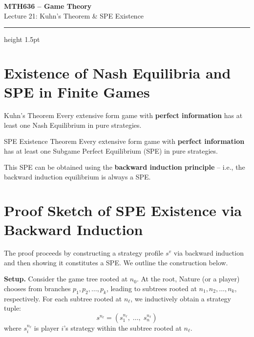 \documentclass[12pt, a4paper]{article}
\begin{document}
\begin{center}
  {\LARGE\bfseries\sffamily\color{defblue} MTH636 -- Game Theory}\\[6pt]
  {\Large\sffamily Lecture 21: Kuhn's Theorem \& SPE Existence}\\[4pt]
\end{center}
\vspace{0.5cm}
\hrule height 1.5pt
\vspace{0.3cm}

\section{Existence of Nash Equilibria and SPE in Finite Games}

\begin{thmbox}{Kuhn's Theorem}
  Every extensive form game with \textbf{perfect information} has at least one Nash Equilibrium in pure strategies.
\end{thmbox}

\begin{thmbox}{SPE Existence Theorem}
  Every extensive form game with \textbf{perfect information} has at least one Subgame Perfect Equilibrium (SPE) in pure strategies.
\end{thmbox}

\begin{notebox}
  This SPE can be obtained using the \textbf{backward induction principle} -- i.e., the backward induction equilibrium is always a SPE.
\end{notebox}

\section{Proof Sketch of SPE Existence via Backward Induction}

The proof proceeds by constructing a strategy profile $s^v$ via backward induction and then showing it constitutes a SPE. We outline the construction below.

\medskip
\noindent\textbf{Setup.} Consider the game tree rooted at $n_0$. At the root, Nature (or a player) chooses from branches $p_1, p_2, \ldots, p_k$, leading to subtrees rooted at $n_1, n_2, \ldots, n_k$, respectively. For each subtree rooted at $n_\ell$, we inductively obtain a strategy tuple:
\[
  s^{n_\ell} = (s_1^{n_\ell},\; \ldots,\; s_n^{n_\ell})
\]
where $s_i^{n_\ell}$ is player $i$'s strategy within the subtree rooted at $n_\ell$.
\end{document}
